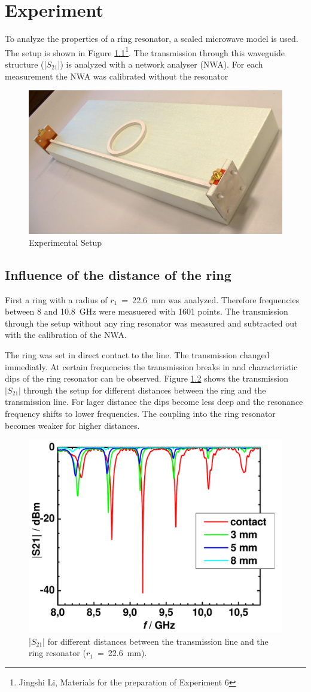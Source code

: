 \chapter{Experiment}

To analyze the properties of a ring resonator, a scaled microwave model is used. The setup is shown in Figure \ref{fig:setup}\footnote[1]{Jingshi Li, Materials for the preparation of Experiment 6}. The transmission through this waveguide structure (|$S_{21}$|) is analyzed with a network analyser (NWA). For each measurement the NWA was calibrated without the resonator 
\begin{figure}%
\centering
\includegraphics[width=.5\columnwidth]{Grafiken/foto_resonator.jpg}%
\caption{Experimental Setup}%
\label{fig:setup}%
\end{figure}

\section{Influence of the distance of the ring}
First a ring with a radius of $r_1$~=~22.6~mm was analyzed. Therefore frequencies between 8 and 10.8~GHz were measuered with 1601 points. The transmission through the setup without any ring resonator was measured and subtracted out with the calibration of the NWA.

The ring was set in direct contact to the line. The transmission changed immediatly. At certain frequencies the transmission breaks in and characteristic dips of the ring resonator can be observed. Figure \ref{fig:01_s21} shows the transmission $|S_{21}|$ through the setup for different distances between the ring and the transmission line.
For lager distance the dips become less deep and the resonance frequency shifts to lower frequencies. The coupling into the ring resonator becomes weaker for higher distances.
 
\begin{figure}%
\centering
\includegraphics[width=.6\columnwidth]{Grafiken/01_s21.pdf}%
\caption{|$S_{21}$| for different distances between the transmission line and the ring resonator ($r_1$~=~22.6~mm).}%
\label{fig:01_s21}%
\end{figure}

